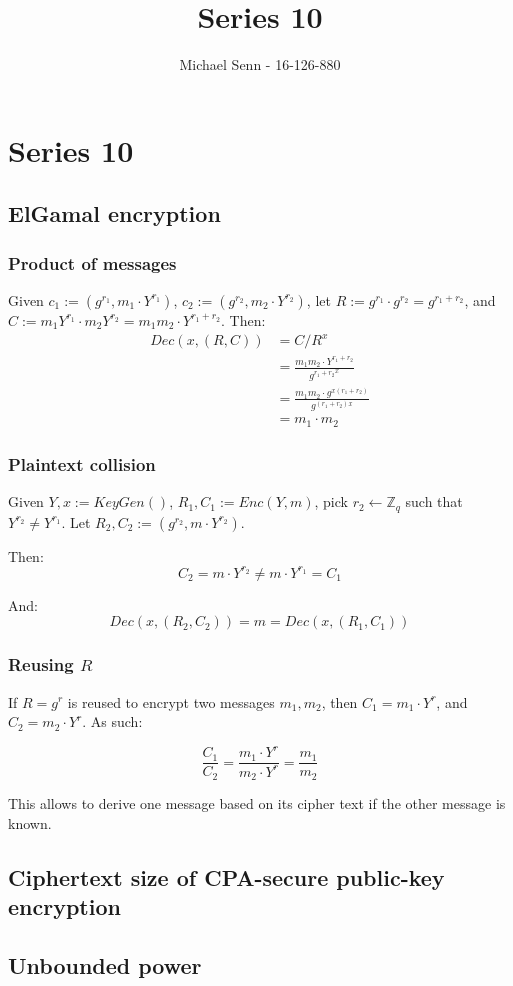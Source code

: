 \documentclass[a4paper]{scrreprt}
\title{Series 10}
\author{Michael Senn \maillink{michael.senn@students.unibe.ch} - 16-126-880}
\date{\printdate}
\begin{document}
\maketitle


\setcounter{chapter}{9}
\chapter{Series 10}

\section{ElGamal encryption}


\subsection{Product of messages}

Given $c_1 := (g^{r_1}, m_1 \cdot Y^{r_1})$, $c_2 := (g^{r_2}, m_2 
\cdot Y^{r_2})$, let $R := g^{r_1} \cdot g^{r_2} = g^{r_1 + r_2}$, and $C := m_1
 Y^{r_1} \cdot m_2 Y^{r_2} = m_1 m_2 \cdot Y^{r_1 + r_2}$. Then:
\begin{align*}
  Dec(x, (R, C)) & = C / R^x \\
                 & = \frac{m_1 m_2 \cdot Y^{r_1 + r_2}}{{g^{r_1 + r_2}}^{x}} \\
                 & = \frac{m_1 m_2 \cdot g^{x (r_1 + r_2)}}{g^{(r_1 + r_2)x}} \\
                 & = m_1 \cdot m_2
\end{align*}

\subsection{Plaintext collision}

Given $Y, x := KeyGen()$, $R_1, C_1 := Enc(Y, m)$, pick $r_2 \leftarrow
\mathbb{Z}_q$ such that $Y^{r_2} \neq Y^{r_1}$. Let $R_2, C_2 := (g^{r_2}, m \cdot
Y^{r_2})$.

Then:
\[
  C_2 = m \cdot Y^{r_2} \neq m \cdot Y^{r_1} = C_1
\]

And:
\[
  Dec(x, (R_2, C_2)) = m = Dec(x, (R_1, C_1))
\]

\subsection{Reusing $R$}

If $R = g^r$ is reused to encrypt two messages $m_1, m_2$, then $C_1 = m_1
\cdot Y^r$, and $C_2 = m_2 \cdot Y^r$. As such:

\[
  \frac{C_1}{C_2} = \frac{m_1 \cdot Y^r}{m_2 \cdot Y^r} = \frac{m_1}{m_2}
\]

This allows to derive one message based on its cipher text if the other message
is known.

\section{Ciphertext size of CPA-secure public-key encryption}

\section{Unbounded power}
\end{document}
